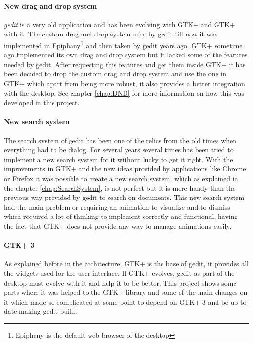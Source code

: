 \paragraph{New drag and drop system}

\emph{gedit} is a very old application and has been evolving with GTK+ and GTK+
with it. The custom drag and drop system used by gedit till now it was implemented 
in Epiphany\footnote{Epiphany is the default web browser of the \GNOME desktop} 
and then taken by gedit years ago. GTK+ sometime ago implemented its own drag 
and drop system but it lacked some of the features needed by gedit. After requesting 
this features and get them inside GTK+ it has been decided to drop the custom 
drag and drop system and use the one in GTK+ which apart from being more robust, 
it also provides a better integration with the desktop. See chapter \ref{chap:DND}
for more information on how this was developed in this project.

\paragraph{New search system}

The search system of gedit has been one of the relics from the old times when 
everything had to be dialog. For several years several times has been tried to 
implement a new search system for it without lucky to get it right. With the 
improvements in GTK+ and the new ideas provided by applications like Chrome or 
Firefox it was possible to create a new search system, which as explained in the 
chapter \ref{chap:SearchSystem}, is not perfect but it is more handy than the
previous way provided by gedit to search on documents. This new search system 
had the main problem or requiring an animation to visualize and to dismiss which 
required a lot of thinking to implement correctly and functional, having the fact 
that GTK+ does not provide any way to manage animations easily.

\paragraph{GTK+ 3}

As explained before in the architecture, GTK+ is the base of gedit, it provides 
all the widgets used for the user interface. If GTK+ evolves, gedit as part of 
the \GNOME desktop must evolve with it and help it to be better. This project 
shows some parts where it was helped to the GTK+ library and some of the main 
changes on it which made so complicated at some point to depend on GTK+ 3 and be 
up to date making gedit build.


